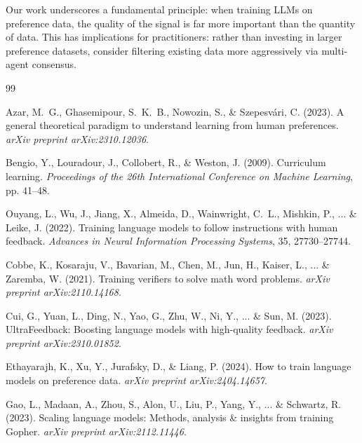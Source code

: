 \documentclass{article}
\begin{document}
Our work underscores a fundamental principle: when training LLMs on preference data, the quality of the signal is far more important than the quantity of data.
This has implications for practitioners: rather than investing in larger preference datasets, consider filtering existing data more aggressively via multi-agent consensus.



\begin{thebibliography}{99}

Azar, M.~G., Ghasemipour, S.~K.~B., Nowozin, S., \& Szepesv\'ari, C. (2023).
A general theoretical paradigm to understand learning from human preferences.
\textit{arXiv preprint arXiv:2310.12036}.

Bengio, Y., Louradour, J., Collobert, R., \& Weston, J. (2009).
Curriculum learning.
\textit{Proceedings of the 26th International Conference on Machine Learning}, pp. 41--48.

Ouyang, L., Wu, J., Jiang, X., Almeida, D., Wainwright, C.~L., Mishkin, P., ... \& Leike, J. (2022).
Training language models to follow instructions with human feedback.
\textit{Advances in Neural Information Processing Systems}, 35, 27730--27744.

Cobbe, K., Kosaraju, V., Bavarian, M., Chen, M., Jun, H., Kaiser, L., ... \& Zaremba, W. (2021).
Training verifiers to solve math word problems.
\textit{arXiv preprint arXiv:2110.14168}.

Cui, G., Yuan, L., Ding, N., Yao, G., Zhu, W., Ni, Y., ... \& Sun, M. (2023).
UltraFeedback: Boosting language models with high-quality feedback.
\textit{arXiv preprint arXiv:2310.01852}.

Ethayarajh, K., Xu, Y., Jurafsky, D., \& Liang, P. (2024).
How to train language models on preference data.
\textit{arXiv preprint arXiv:2404.14657}.

Gao, L., Madaan, A., Zhou, S., Alon, U., Liu, P., Yang, Y., ... \& Schwartz, R. (2023).
Scaling language models: Methods, analysis \& insights from training Gopher.
\textit{arXiv preprint arXiv:2112.11446}.


\end{thebibliography}
\end{document}
